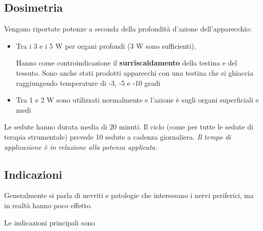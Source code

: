 \subsection{Dosimetria}

Vengono riportate potenze a seconda della profondità d'azione
dell'apparecchio:

\begin{itemize}
\item
  Tra i 3 e i 5 W per organi profondi (3 W sono sufficienti).

Hanno come controindicazione il \textbf{surriscaldamento} della testina
e del tessuto. Sono anche stati prodotti apparecchi con una testina che
si ghiaccia raggiungendo temperature di -3, -5 e -10 gradi

\item
  Tra 1 e 2 W sono utilizzati normalmente e l'azione è sugli organi
  superficiali e medi
\end{itemize}

Le sedute hanno durata media di 20 minuti. Il ciclo (come per tutte le
sedute di terapia strumentale) prevede 10 sedute a cadenza giornaliera.
\emph{Il tempo di applicazione è in relazione alla potenza applicata.}

\subsection{Indicazioni}

Generalmente si parla di nevriti e patologie che interessano i nervi
periferici, ma in realtà hanno poco effetto.

Le indicazioni principali sono

